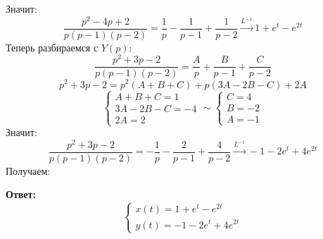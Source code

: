 \documentclass[a4paper,12pt]{article}
\begin{document}
Значит:
\[
 \frac{p^2 - 4p + 2}{p(p-1)(p-2)}  = \frac{1}{p} - \frac{1}{p - 1} + \frac{1}{p-2} \overset{L^{-1}}{\longrightarrow} 1 + e^t - e^{2t}
\]
Теперь разбираемся с $Y(p)$:
\[
\frac{p^2 + 3p -2}{p(p-1)(p-2)} = \frac{A}{p} + \frac{B}{p - 1} + \frac{C}{p-2} 
\]
\[
p^2 + 3p - 2 = p^2(A + B + C) + p(3A - 2B - C) + 2A
\]
\[
\begin{cases}
A + B + C = 1 \\
3A -2B - C = -4 \\
2A =2
\end{cases} \sim 
\begin{cases}
C = 4\\
B = -2\\
A = -1
\end{cases} 
\]
Значит:
\[
\frac{p^2 + 3p -2}{p(p-1)(p-2)} =- \frac{1}{p} - \frac{2}{p - 1} + \frac{4}{p-2} \overset{L^{-1}}{\longrightarrow} - 1 - 2e^t + 4e^{2t}
\]
Получаем:
\begin{center}
\textbf{Ответ: } 
\[
\begin{cases}
x(t) = 1 + e^t - e^{2t} \\
y(t) = - 1 - 2e^t + 4e^{2t}
\end{cases}
\]
\end{center}
\end{document}
